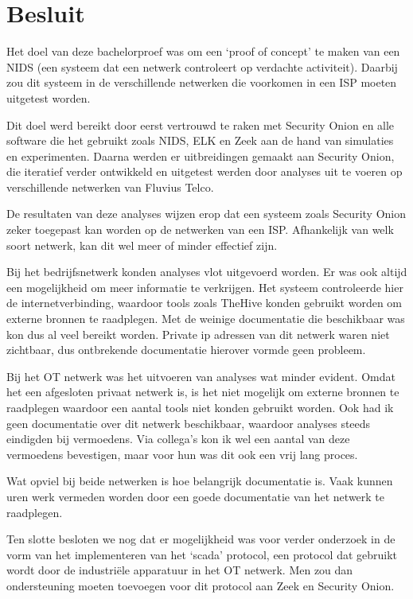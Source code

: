 \documentclass[a4paper, 12pt]{report}
\begin{document}
\chapter*{Besluit}
Het doel van deze bachelorproef was om een `proof of concept' te maken van een NIDS (een systeem dat een netwerk controleert op verdachte activiteit).
Daarbij zou dit systeem in de verschillende netwerken die voorkomen in een ISP moeten uitgetest worden.

Dit doel werd bereikt door eerst vertrouwd te raken met Security Onion en alle software die het gebruikt zoals NIDS, ELK en Zeek aan de hand van simulaties en experimenten.
Daarna werden er uitbreidingen gemaakt aan Security Onion, die iteratief verder ontwikkeld en uitgetest werden door analyses uit te voeren op verschillende netwerken van Fluvius Telco.

De resultaten van deze analyses wijzen erop dat een systeem zoals Security Onion zeker toegepast kan worden op de netwerken van een ISP.
Afhankelijk van welk soort netwerk, kan dit wel meer of minder effectief zijn.

Bij het bedrijfsnetwerk konden analyses vlot uitgevoerd worden.
Er was ook altijd een mogelijkheid om meer informatie te verkrijgen.
Het systeem controleerde hier de internetverbinding, waardoor tools zoals TheHive konden gebruikt worden om externe bronnen te raadplegen.
Met de weinige documentatie die beschikbaar was kon dus al veel bereikt worden.
Private ip adressen van dit netwerk waren niet zichtbaar, dus ontbrekende documentatie hierover vormde geen probleem.

Bij het OT netwerk was het uitvoeren van analyses wat minder evident.
Omdat het een afgesloten privaat netwerk is, is het niet mogelijk om externe bronnen te raadplegen waardoor een aantal tools niet konden gebruikt worden.
Ook had ik geen documentatie over dit netwerk beschikbaar, waardoor analyses steeds eindigden bij vermoedens.
Via collega's kon ik wel een aantal van deze vermoedens bevestigen, maar voor hun was dit ook een vrij lang proces.

Wat opviel bij beide netwerken is hoe belangrijk documentatie is.
Vaak kunnen uren werk vermeden worden door een goede documentatie van het netwerk te raadplegen.

Ten slotte besloten we nog dat er mogelijkheid was voor verder onderzoek in de vorm van het implementeren van het `scada' protocol, een protocol dat gebruikt wordt door de industriële apparatuur in het OT netwerk.
Men zou dan ondersteuning moeten toevoegen voor dit protocol aan Zeek en Security Onion.
\end{document}
